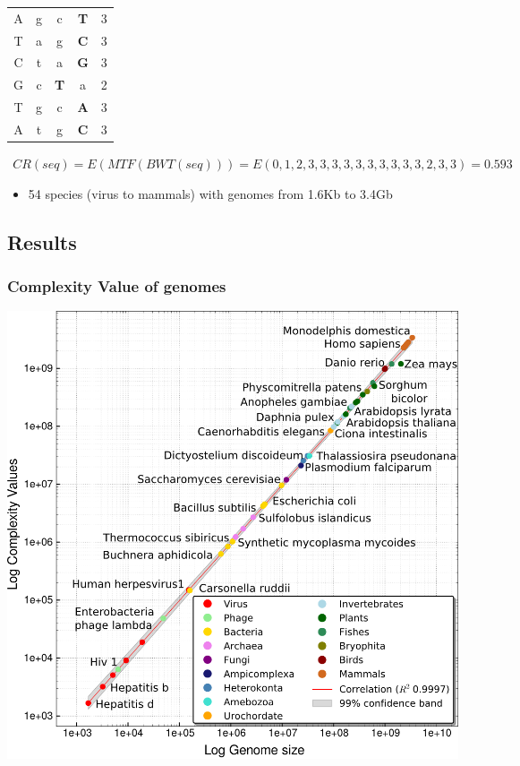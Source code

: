 \documentclass[hyperref={pagebackref=true},table]{beamer}
\begin{document}
\begin{frame}
\begin{table}[!ht]
\begin{center}
\begin{tabular}{ c c c c c }
        A & g & c & \textbf{T} & 3 \\
        T & a & g & \textbf{C} & 3 \\
        C & t & a & \textbf{G} & 3 \\
        G & c & \textbf{T} & a & 2 \\
        T & g & c & \textbf{A} & 3 \\
        A & t & g & \textbf{C} & 3 \\ \hline
      \end{tabular}
  \end{center}
  \pointer 
  $\:\:CR(seq) = E(MTF(BWT(seq))) = E(0, 1, 2, 3, 3, 3, 3, 3, 3, 3, 3, 3, 3, 2, 3, 3) = 0.593$
\end{table}
\begin{itemize}
\item <2> 54 species (virus to mammals) with genomes from 1.6Kb to 3.4Gb
\end{itemize}
\end{frame}

\subsection{Results}

\begin{frame}
  \frametitle{Complexity Value of genomes}
  \begin{center}
    \includegraphics[width=.635\textwidth]{pictures/dna-struct/cv-genomes.png}
  \end{center}
\end{frame}
\end{document}
